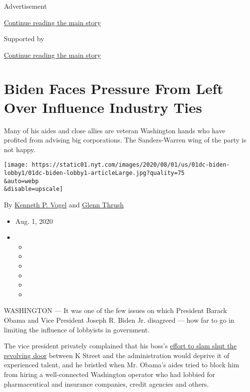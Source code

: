 Advertisement

\protect\hyperlink{after-top}{Continue reading the main story}

Supported by

\protect\hyperlink{after-sponsor}{Continue reading the main story}

\hypertarget{biden-faces-pressure-from-left-over-influence-industry-ties}{%
\section{Biden Faces Pressure From Left Over Influence Industry
Ties}\label{biden-faces-pressure-from-left-over-influence-industry-ties}}

Many of his aides and close allies are veteran Washington hands who have
profited from advising big corporations. The Sanders-Warren wing of the
party is not happy.

\texttt{[image: https://static01.nyt.com/images/2020/08/01/us/01dc-biden-lobby1/01dc-biden-lobby1-articleLarge.jpg?quality=75\\\&auto=webp\\\&disable=upscale]}

By \href{https://www.nytimes.com/by/kenneth-p-vogel}{Kenneth P. Vogel}
and \href{https://www.nytimes.com/by/glenn-thrush}{Glenn Thrush}

\begin{itemize}
\item
  Aug. 1, 2020
\item
  \begin{itemize}
  \item
  \item
  \item
  \item
  \item
  \item
  \end{itemize}
\end{itemize}

WASHINGTON --- It was one of the few issues on which President Barack
Obama and Vice President Joseph R. Biden Jr. disagreed --- how far to go
in limiting the influence of lobbyists in government.

The vice president privately complained that his boss's
\href{https://www.nytimes.com/2009/01/22/us/politics/22obama.html}{effort
to slam shut the revolving door} between K Street and the administration
would deprive it of experienced talent, and he bristled when Mr. Obama's
aides tried to block him from hiring a well-connected Washington
operator who had lobbied for pharmaceutical and insurance companies,
credit agencies and others.

